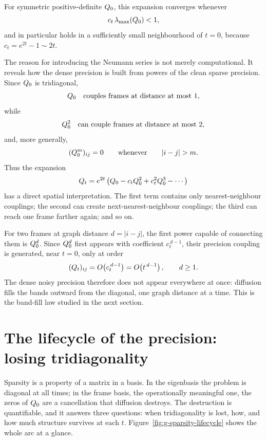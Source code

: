 For symmetric positive-definite $Q_0$, this expansion converges whenever
\begin{equation}
  c_t\,\lambda_{\max}(Q_0)<1,
  \label{eq:g-neumann-condition}
\end{equation}
and in particular holds in a sufficiently small neighbourhood of $t=0$,
because $c_t=e^{2t}-1\sim2t$.

The reason for introducing the Neumann series is not merely computational.
It reveals how the dense precision is built from powers of the clean sparse
precision. Since $Q_0$ is tridiagonal,
\[
  Q_0
  \quad\text{couples frames at distance at most }1,
\]
while
\[
  Q_0^2
  \quad\text{can couple frames at distance at most }2,
\]
and, more generally,
\begin{equation}
  (\Qz^m)_{ij}=0
  \qquad\text{whenever}\qquad
  |i-j|>m.
  \label{eq:g-power-bandwidth}
\end{equation}
Thus the expansion
\begin{equation}
  Q_t
  =
  e^{2t}
  \left(
    Q_0
    -c_tQ_0^2
    +c_t^2Q_0^3
    -\cdots
  \right)
\end{equation}
has a direct spatial interpretation. The first term contains only
nearest-neighbour couplings; the second can create next-nearest-neighbour
couplings; the third can reach one frame farther again; and so on.

For two frames at graph distance $d=|i-j|$, the first power capable of
connecting them is $Q_0^d$. Since $Q_0^d$ first appears with coefficient
$c_t^{\,d-1}$, their precision coupling is generated, near $t=0$, only at
order
\begin{equation}
  (Q_t)_{ij}
  =
  O\!\left(c_t^{\,d-1}\right)
  =
  O\!\left(t^{\,d-1}\right),
  \qquad d\geq1.
  \label{eq:g-band-fill-order}
\end{equation}
The dense noisy precision therefore does not appear everywhere at once:
diffusion fills the bands outward from the diagonal, one graph distance at
a time. This is the band-fill law studied in the next section.


\section{The lifecycle of the precision: losing tridiagonality}
\label{sec:g-tridiag-loss}

Sparsity is a property of a matrix in a basis. In the eigenbasis the
problem is diagonal at all times; in the frame basis, the operationally
meaningful one, the zeros of $Q_0$ are a cancellation that diffusion
destroys. The destruction is quantifiable, and it answers three questions:
when tridiagonality is lost, how, and how much structure survives at
each $t$. Figure~\ref{fig:g-sparsity-lifecycle} shows the whole arc at a
glance.

